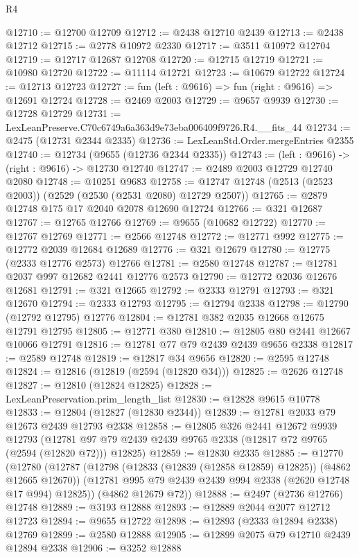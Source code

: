 \begin{lexlean}{R4}
\begin{coremodule}
@12710 := @12700 @12709
@12712 := @2438 @12710 @2439
@12713 := @2438 @12712
@12715 := @2778 @10972 @2330
@12717 := @3511 @10972 @12704
@12719 := @12717 @12687 @12708
@12720 := @12715 @12719
@12721 := @10980 @12720
@12722 := @11114 @12721
@12723 := @10679 @12722
@12724 := @12713 @12723
@12727 := fun (left : @9616) => fun (right : @9616) => @12691 @12724
@12728 := @2469 @2003
@12729 := @9657 @9939
@12730 := @12728 @12729
@12731 := LexLeanPreserve.C70c6749a6a363d9e73eba006409f9726.R4.__fits_44
@12734 := @2475 (@12731 @2344 @2335)
@12736 := LexLeanStd.Order.mergeEntries @2355
@12740 := @12734 (@9655 (@12736 @2344 @2335))
@12743 := (left : @9616) -> (right : @9616) -> @12730 @12740
@12747 := @2489 @2003 @12729 @12740 @2080
@12748 := @10251 @9683
@12758 := @12747 @12748 (@2513 (@2523 @2003)) (@2529 (@2530 (@2531 @2080) @12729 @2507))
@12765 := @2879 @12748 @175 @17 @2040 @2078 @12690 @12724
@12766 := @321 @12687
@12767 := @12765 @12766
@12769 := @9655 (@10682 @12722)
@12770 := @12767 @12769
@12771 := @2566 @12748
@12772 := @12771 @992
@12775 := @12772 @2039 @12684 @12689
@12776 := @321 @12679
@12780 := @12775 (@2333 @12776 @2573) @12766
@12781 := @2580 @12748
@12787 := @12781 @2037 @997 @12682 @2441 @12776 @2573
@12790 := @12772 @2036 @12676 @12681
@12791 := @321 @12665
@12792 := @2333 @12791
@12793 := @321 @12670
@12794 := @2333 @12793
@12795 := @12794 @2338
@12798 := @12790 (@12792 @12795) @12776
@12804 := @12781 @382 @2035 @12668 @12675 @12791 @12795
@12805 := @12771 @380
@12810 := @12805 @80 @2441 @12667 @10066 @12791
@12816 := @12781 @77 @79 @2439 @2439 @9656 @2338
@12817 := @2589 @12748
@12819 := @12817 @34 @9656
@12820 := @2595 @12748
@12824 := @12816 (@12819 (@2594 (@12820 @34)))
@12825 := @2626 @12748
@12827 := @12810 (@12824 @12825)
@12828 := LexLeanPreservation.prim_length_list
@12830 := @12828 @9615 @10778
@12833 := @12804 (@12827 (@12830 @2344))
@12839 := @12781 @2033 @79 @12673 @2439 @12793 @2338
@12858 := @12805
    @326
    @2441
    @12672
    @9939
    @12793
    (@12781 @97 @79 @2439 @2439 @9765 @2338 (@12817 @72 @9765 (@2594 (@12820 @72))) @12825)
@12859 := @12830 @2335
@12885 := @12770
    (@12780
      (@12787
        (@12798 (@12833 (@12839 (@12858 @12859) @12825)) (@4862 @12665 @12670))
        (@12781 @995 @79 @2439 @2439 @994 @2338 (@2620 @12748 @17 @994) @12825))
      (@4862 @12679 @72))
@12888 := @2497 (@2736 @12766) @12748
@12889 := @3193 @12888
@12893 := @12889 @2044 @2077 @12712 @12723
@12894 := @9655 @12722
@12898 := @12893 (@2333 @12894 @2338) @12769
@12899 := @2580 @12888
@12905 := @12899 @2075 @79 @12710 @2439 @12894 @2338
@12906 := @3252 @12888

\end{coremodule}
\end{lexlean}
